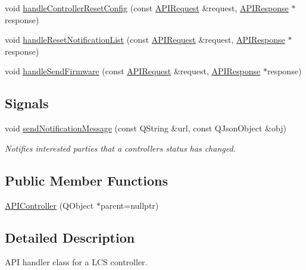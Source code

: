 \begin{DoxyCompactItemize}
\item 
void \hyperlink{class_a_p_i_controller_a0d4deeaff703bb7d60eb344e6ee9f8cb}{handle\+Controller\+Reset\+Config} (const \hyperlink{class_a_p_i_request}{A\+P\+I\+Request} \&request, \hyperlink{class_a_p_i_response}{A\+P\+I\+Response} $\ast$response)
\item 
void \hyperlink{class_a_p_i_controller_a9b2f08f4b0a67c0a4f6891a9d8601b93}{handle\+Reset\+Notification\+List} (const \hyperlink{class_a_p_i_request}{A\+P\+I\+Request} \&request, \hyperlink{class_a_p_i_response}{A\+P\+I\+Response} $\ast$response)
\item 
void \hyperlink{class_a_p_i_controller_a2e140228ff2335d0d1a92d2353702c22}{handle\+Send\+Firmware} (const \hyperlink{class_a_p_i_request}{A\+P\+I\+Request} \&request, \hyperlink{class_a_p_i_response}{A\+P\+I\+Response} $\ast$response)
\end{DoxyCompactItemize}
\subsection*{Signals}
\begin{DoxyCompactItemize}
\item 
\mbox{\label{class_a_p_i_controller_aa31deccd23ec06a6dc92b449b0bc86f8}} 
void \hyperlink{class_a_p_i_controller_aa31deccd23ec06a6dc92b449b0bc86f8}{send\+Notification\+Message} (const Q\+String \&url, const Q\+Json\+Object \&obj)
\begin{DoxyCompactList}\small\item\em Notifies interested parties that a controller\textquotesingle{}s status has changed. \end{DoxyCompactList}\end{DoxyCompactItemize}
\subsection*{Public Member Functions}
\begin{DoxyCompactItemize}
\item 
\hyperlink{class_a_p_i_controller_a779b634bce4b7fcbec9fca8f5f8f63e6}{A\+P\+I\+Controller} (Q\+Object $\ast$parent=nullptr)
\end{DoxyCompactItemize}


\subsection{Detailed Description}
A\+PI handler class for a L\+CS controller. 

